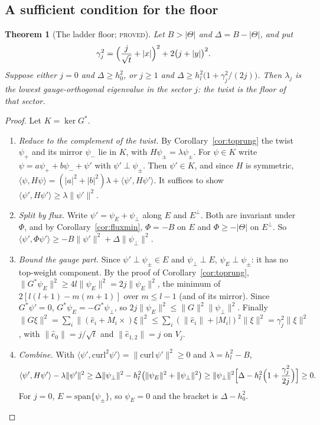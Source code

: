 \documentclass[11pt]{article}
\newtheorem{theorem}{Theorem}[section]
\theoremstyle{definition}
\theoremstyle{remark}
\newcommand{\norm}[1]{\lVert #1\rVert}
\newcommand{\PROVED}{\textsc{proved}}
\begin{document}
\subsection{A sufficient condition for the floor}\label{subsec:ladderfloor}

\begin{theorem}[The ladder floor; \PROVED]\label{thm:ladderfloor}
Let $B>|\Theta|$ and $\Delta=B-|\Theta|$, and put
\[
  \gamma_j^2=\Bigl(\frac j{\sqrt t}+|x|\Bigr)^2+2\bigl(j+|y|\bigr)^2 .
\]
Suppose either $j=0$ and $\Delta\ge h_0^2$, or $j\ge1$ and $\Delta\ge h_l^2\bigl(1+\gamma_j^2/(2j)\bigr)$. Then
$\lambda_j$ is the lowest gauge-orthogonal eigenvalue in the sector $j$: the twist is the floor of that sector.
\end{theorem}
\begin{proof}
Let $K=\ker G^*$.
\begin{enumerate}
  \item \emph{Reduce to the complement of the twist.} By Corollary~\ref{cor:toprung} the twist $\psi_+$ and its mirror
    $\psi_-$ lie in $K$, with $H\psi_\pm=\lambda\psi_\pm$. For $\psi\in K$ write $\psi=a\psi_++b\psi_-+\psi'$ with
    $\psi'\perp\psi_\pm$. Then $\psi'\in K$, and since $H$ is symmetric,
    $\langle\psi,H\psi\rangle=(|a|^2+|b|^2)\lambda+\langle\psi',H\psi'\rangle$. It suffices to show
    $\langle\psi',H\psi'\rangle\ge\lambda\norm{\psi'}^2$.
  \item \emph{Split by flux.} Write $\psi'=\psi_E+\psi_\perp$ along $E$ and $E^\perp$. Both are invariant under $\Phi$,
    and by Corollary~\ref{cor:fluxmin}, $\Phi=-B$ on $E$ and $\Phi\ge-|\Theta|$ on $E^\perp$. So
    $\langle\psi',\Phi\psi'\rangle\ge-B\norm{\psi'}^2+\Delta\norm{\psi_\perp}^2$.
  \item \emph{Bound the gauge part.} Since $\psi'\perp\psi_\pm\in E$ and $\psi_\perp\perp E$, $\psi_E\perp\psi_\pm$: it has
    no top-weight component. By the proof of Corollary~\ref{cor:toprung}, $\norm{G^*\psi_E}^2\ge4l\norm{\psi_E}^2=2j\norm{\psi_E}^2$,
    the minimum of $2[l(l+1)-m(m+1)]$ over $m\le l-1$ (and of its mirror). Since $G^*\psi'=0$,
    $G^*\psi_E=-G^*\psi_\perp$, so $2j\norm{\psi_E}^2\le\norm G^2\norm{\psi_\perp}^2$. Finally
    $\norm{G\xi}^2=\sum_i\norm{(\hat e_i+M_i\times)\xi}^2\le\sum_i(\norm{\hat e_i}+|M_i|)^2\norm\xi^2=\gamma_j^2\norm\xi^2$,
    with $\norm{\hat e_0}=j/\sqrt t$ and $\norm{\hat e_{1,2}}=j$ on $V_j$.
  \item \emph{Combine.} With $\langle\psi',\mathrm{curl}^2\psi'\rangle=\norm{\mathrm{curl}\,\psi'}^2\ge0$ and $\lambda=h_l^2-B$,
    \[
      \langle\psi',H\psi'\rangle-\lambda\norm{\psi'}^2\ge\Delta\norm{\psi_\perp}^2-h_l^2\bigl(\norm{\psi_E}^2+\norm{\psi_\perp}^2\bigr)
      \ge\norm{\psi_\perp}^2\Bigl[\Delta-h_l^2\Bigl(1+\frac{\gamma_j^2}{2j}\Bigr)\Bigr]\ge0 .
    \]
    For $j=0$, $E=\mathrm{span}\{\psi_\pm\}$, so $\psi_E=0$ and the bracket is $\Delta-h_0^2$. \qedhere
\end{enumerate}
\end{proof}
\end{document}
